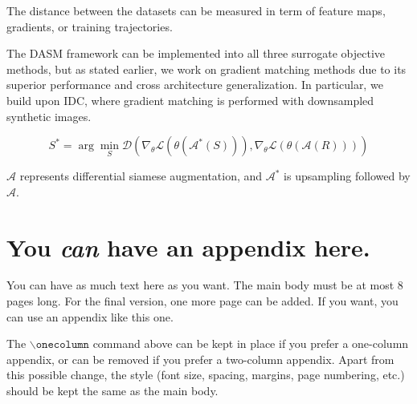 \documentclass{article}
\theoremstyle{plain}
\theoremstyle{definition}
\theoremstyle{remark}
\begin{document}
The distance between the datasets can be measured in term of feature maps, gradients, or training trajectories. 

The  DASM framework can be implemented into all three surrogate objective methods, but as stated earlier, we work on gradient matching methods due to its superior performance and cross architecture generalization. In particular, we build upon IDC, where gradient matching is performed with downsampled synthetic images.

\begin{equation}
S^* = \arg \min_{S} \mathcal{D} \left( \nabla_{\theta} \mathcal{L}(\theta(\mathcal{A}^*(S))), \nabla_{\theta} \mathcal{L}(\theta(\mathcal{A}(R))) \right)
\end{equation}

$\mathcal{A}$ represents differential siamese augmentation, and $\mathcal{A}^*$ is upsampling followed by $\mathcal{A}$.






\nocite{langley00}





\newpage
\appendix
\onecolumn
\section{You \emph{can} have an appendix here.}

You can have as much text here as you want. The main body must be at most $8$ pages long.
For the final version, one more page can be added.
If you want, you can use an appendix like this one.  

The $\mathtt{\backslash onecolumn}$ command above can be kept in place if you prefer a one-column appendix, or can be removed if you prefer a two-column appendix.  Apart from this possible change, the style (font size, spacing, margins, page numbering, etc.) should be kept the same as the main body.
\end{document}

